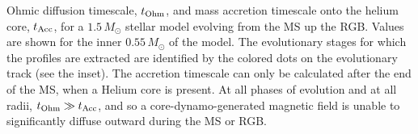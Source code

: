 \label{fig:timescales}
Ohmic diffusion timescale, $t_{\rm Ohm}$, and mass accretion timescale onto the helium core, $t_{\rm Acc}$, for a $1.5 \, M_\odot$ stellar model evolving from the MS up the RGB. Values are shown for the inner $0.55 \, M_\odot$ of the model. The evolutionary stages for which the profiles are extracted are identified by the colored dots on the evolutionary track (see the inset). The accretion timescale can only be calculated after the end of the MS, when a Helium core is present. At all phases of evolution and at all radii, $t_{\rm Ohm} \gg t_{\rm Acc}$, and so a core-dynamo-generated magnetic field is unable to significantly diffuse outward during the MS or RGB.
  